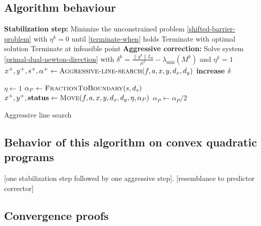 \documentclass{article}
\begin{document}
\subsection{Algorithm behaviour}

\begin{algorithm}[H]
\begin{algorithmic}
\State \textbf{Stabilization step:}
    \Indent
\State Minimize the unconstrained problem \eqref{shifted-barrier-problem} with $\eta^k = 0$ until \eqref{terminate-when} holds
     \EndIndent
{}
\State Terminate with optimal solution
\State Terminate at infeasible point 
\EndIf
{}
\State \textbf{Aggressive correction:}
    \Indent
\State Solve system \eqref{primal-dual-newton-direction} with $\delta^k = \frac{\| g^k \| L_0}{\mu^k} - \lambda_{\min}{(M^{k})}
$ and $\eta^{k} = 1$
\State  $x^{+}, y^{+}, s^{+}, \alpha^{+} \gets \Call{Aggressive-line-search}{\obj, \cons, x, y, d_{x}, d_{y}}$
\State \textbf{increase $\delta$}
\EndIf
\EndIndent
\EndIf
\EndFor
\EndFunction
\end{algorithmic}
\end{algorithm}

\begin{algorithm}[H]
\begin{algorithmic}
\State $\eta \gets 1$
\State $\alpha_{P} \gets \Call{FractionToBoundary}{s, d_{s} }$
\State $x^{+}, y^{+}, \status \gets \Call{Move}{\obj, \cons, x, y, d_{x}, d_{y}, \eta, \alpha_{P}}$
\State {}
\Else
\State $\alpha_{P} \gets \alpha_{P} / 2$
\EndIf
\EndFor
\EndFunction
\end{algorithmic}
\caption{Aggressive line search}
\end{algorithm}

\subsection{Behavior of this algorithm on convex quadratic programs}

[one stabilization step followed by one aggressive step]. [resemblance to predictor corrector]

\subsection{Convergence proofs}
\end{document}
